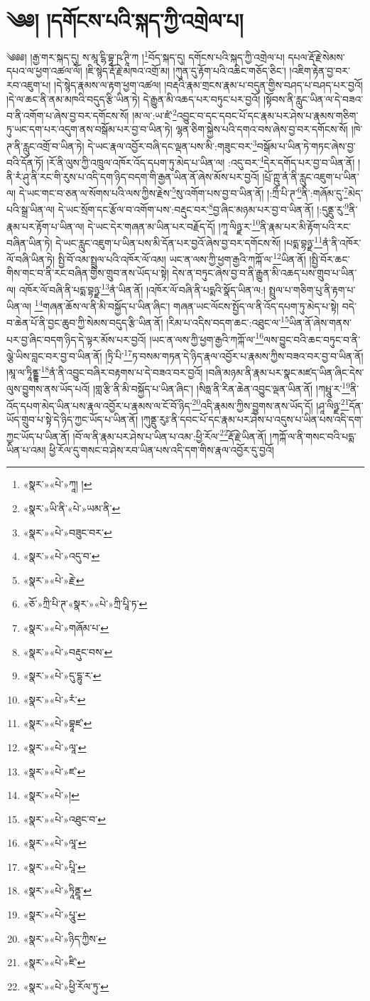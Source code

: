 \chapter{༄༅། །དགོངས་པའི་སྐད་ཀྱི་འགྲེལ་པ།}༄༅༅། །རྒྱ་གར་སྐད་དུ། ས་མཱ་ངྷི་བྷཱ་ཥ་ཊཱི་ཀ །\footnote{«སྣར་»«པེ་»ཀཱ། །}བོད་སྐད་དུ། དགོངས་པའི་སྐད་ཀྱི་འགྲེལ་པ། དཔལ་རྡོ་རྗེ་སེམས་དཔའ་ལ་ཕྱག་འཚལ་ལོ། །ཇི་སྙེད་རྡོ་རྗེ་མཁའ་འགྲོ་མ། །ཀུན་དུ་རྟོག་པའི་འཆིང་གཅོད་ཅིང་། །འཇིག་རྟེན་བྱ་བར་རབ་འཇུག་པ། །དེ་སྙེད་རྣམས་ལ་རྟག་ཕྱག་འཚལ། །བརྡའི་རྣམ་གྲངས་རྣམ་པ་བདུན་གྱིས་བཤད་པ་བཤད་པར་བྱའོ། །དེ་ལ་ཆང་ནི་ནམ་མཁའི་བདུད་རྩི་ཡིན་ཏེ། དེ་རྒྱུན་མི་འཆད་པར་བཏུང་པར་བྱའོ། །སྟོབས་ནི་རླུང་ཡིན་ལ་དེ་བཟའ་བ་ནི་འགོག་པ་ཞེས་བྱ་བར་དགོངས་སོ། །མ་ལ་:ཡ་ཛཾ་\footnote{«སྣར་»ཡི་ནི་«པེ་»ཡམ་ནི་}འབྱུང་བ་དང་དབང་པོ་དང་རྣམ་པར་ཤེས་པ་རྣམས་གཅིག་ཏུ་ཡང་དག་པར་འདུག་ནས་བསྒོམ་པར་བྱ་བ་ཡིན་ཏེ། ལྷན་ཅིག་སྐྱེས་པའི་དགའ་བས་ཞེས་བྱ་བར་དགོངས་སོ། །ཁེ་ཊ་ནི་རླུང་འགྲོ་བ་ཡིན་ཏེ། དེ་ཡང་རྣལ་འབྱོར་བཞི་དང་ལྡན་པས་མི་:གཟུང་བར་\footnote{«སྣར་»«པེ་»བཟུང་བར་}བསྒོམ་པ་ཡིན་ཏེ་གཏང་ཞེས་བྱ་བའི་དོན་ཏོ། །རོ་ནི་ལུས་ཀྱི་འཁྲུལ་འཁོར་འོད་དཔག་ཏུ་མེད་པ་ཡིན་ལ། :འདུ་བར་\footnote{«སྣར་»«པེ་»འདུ་བ་}དེར་དགོད་པར་བྱ་བ་ཡིན་ནོ། །ནི་རཾ་ཤུ་ནི་རང་གི་རུས་པ་འདི་དག་ཉིད་བདག་གི་རྒྱན་ཡིན་ནོ་ཞེས་མོས་པར་བྱའོ། །པྲོ་ཀྵུ་ནཾ་ནི་རླུང་འཇུག་པ་ཡིན་ལ། དེ་ཡང་གང་བ་ཅན་ལ་སོགས་པའི་ལས་ཀྱིས་རྗེས་\footnote{«སྣར་»«པེ་»རྗེ་}སུ་འགོག་པས་བྱ་བ་ཡིན་ནོ། །:ཀྲྀ་པི་ཊ་\footnote{«ཅོ་»ཀྲི་པི་ཊ་«སྣར་»«པེ་»ཀྲི་པཱི་ཏ་}ནི་:གཞོམ་དུ་\footnote{«སྣར་»«པེ་»གཞོམ་པ་}མེད་པའི་སྒྲ་ཡིན་ལ། དེ་ཡང་སྲོག་དང་རྩོལ་བ་འགོག་པས་:བརྡུང་བར་\footnote{«སྣར་»«པེ་»བརྡུང་བས་}བྱ་ཞིང་མཉམ་པར་བྱ་བ་ཡིན་ནོ། །:དུནྡུ་རུ་\footnote{«སྣར་»«པེ་»དུ་དྷུ་ར་}ནི་རྣམ་པར་རྟོག་པ་ཡིན་ལ། དེ་ཡང་དེར་གཞན་མ་ཡིན་པར་བརྗོད་དོ། །ཀཱ་ལིཉྫ་ར་\footnote{«སྣར་»«པེ་»རཾ་}ནི་རྣམ་པར་མི་རྟོག་པའི་རང་བཞིན་ཡིན་ཏེ། དེ་ཡང་རླུང་འཇུག་པ་ཡིན་པས་མི་དོན་པར་བྱའོ་ཞེས་བྱ་བར་དགོངས་སོ། །པདྨ་བྷཉྫ་\footnote{«སྣར་»«པེ་»བྷཱཛ་}ནཾ་ནི་འཁོར་ལོ་བཞི་ཡིན་ཏེ། སྤྱི་བོ་འམ་སྤྲུལ་པའི་འཁོར་ལོ་འམ། ཡང་ན་ལས་ཀྱི་ཕྱག་རྒྱའི་ཀཀྐོ་ལ་\footnote{«སྣར་»«པེ་»ལཱ་}ཡིན་ནོ། །སྤྱི་བོར་ཆང་གིས་གང་བ་ནི་རང་བཞིན་གྱིས་གྲུབ་ནས་ཡོད་པ་སྟེ། དེས་ན་བཏུང་ཞེས་བྱ་བ་ནི་རྒྱུན་མི་འཆད་པས་གྲུབ་པ་ཡིན་ལ། འཁོར་ལོ་བཞི་ནི་པདྨ་བྷཉྫ་\footnote{«སྣར་»«པེ་»ཛ་}ནཾ་ཡིན་ནོ། །འཁོར་ལོ་བཞི་ནི་པདྨའི་སྣོད་ཡིན་ལ:། སྤྲུལ་པ་གཅིག་པུ་ནི་རྟག་པ་ཡིན་ལ། \footnote{«སྣར་»«པེ་»།  }གཞན་ཆོས་ལ་ནི་མི་བསྐྱོད་པ་ཡིན་ཞིང་། གཞན་ཡང་ལོངས་སྤྱོད་ལ་ནི་འོད་དཔག་ཏུ་མེད་པ་སྟེ། བདེ་བ་ཆེན་པོ་ནི་བྱང་ཆུབ་ཀྱི་སེམས་བདུད་རྩི་ཡིན་ནོ། །རིམ་པ་འདིས་བདག་ཆང་:འཐུང་ལ་\footnote{«སྣར་»«པེ་»འཐུང་བ་}ཡིན་ནོ་ཞེས་གནས་པར་བྱ་ཞིང་བདག་ཉིད་དེ་ལྟར་མོས་པར་བྱའོ། །ཡང་ན་ལས་ཀྱི་ཕྱག་རྒྱའི་ཀཀྐོ་ལ་\footnote{«སྣར་»«པེ་»ལཱ་}ལས་བྱུང་བའི་ཆང་བཏུང་བ་ནི་ལྕེ་ཡིས་བླང་བར་བྱ་བ་ཡིན་ནོ། །ཏྲི་པི་\footnote{«སྣར་»«པེ་»པཱི་}ཏ་བསམ་གཏན་དེ་ཉིད་རྣལ་འབྱོར་པ་རྣམས་ཀྱིས་བཟའ་བར་བྱ་བ་ཡིན་ནོ། །མཱ་ལ་ཏཱིནྡྷ་\footnote{«སྣར་»«པེ་»ཏཱིནྡཱ་}ནཾ་ནི་འབྱུང་བཞིར་བརྟགས་པ་དེ་བཟའ་བར་བྱའོ། །བཞི་མཉམ་ནི་རྣམ་པར་སྣང་མཛད་ཡིན་ཞིང་དེས་ལུས་བྱུགས་ནས་ཡོད་པའོ། །གླ་རྩི་ནི་མི་བསྐྱོད་པ་ཡིན་ཞིང་། །སིཧླ་ནི་རིན་ཆེན་འབྱུང་ལྡན་ཡིན་ནོ། །ཀཔྤཱུ་ར་\footnote{«སྣར་»«པེ་»པཱུ་}ནི་འོད་དཔག་མེད་ཡིན་པས་རྣལ་འབྱོར་པ་རྣམས་ལ་ངོ་བོ་ཉིད་\footnote{«སྣར་»«པེ་»ཉིད་ཀྱིས་}འདི་རྣམས་ཀྱིས་བྱུགས་ནས་ཡོད་དོ། །ཤཱ་ལིཉྫ་\footnote{«སྣར་»«པེ་»ཛི་}དོན་ཡོད་གྲུབ་པ་སྟེ་དེ་ཉིད་ཀྱང་ཡོད་པ་ཡིན་ནོ། །ཀུནྡུ་རུཿ་ནི་དབང་པོ་དང་རྣམ་པར་ཤེས་པ་འདུས་པ་ཡིན་པས་འདི་དག་ཀྱང་ཡོད་པ་ཡིན་ནོ། །བོ་ལ་ནི་རྣམ་པར་ཤེས་པ་ཡིན་པ་འམ་:ཕྱི་རོལ་\footnote{«སྣར་»«པེ་»ཕྱི་རོལ་ཏུ་}རྡོ་རྗེ་ཡིན་ནོ། །ཀཀྐོ་ལ་ནི་གསང་བའི་པདྨ་ཡིན་པ་འམ། ཕྱི་རོལ་དུ་གསང་བ་ཤེས་རབ་ཡིན་པས་འདི་དག་གིས་རྣལ་འབྱོར་དུ་བྱའོ། 